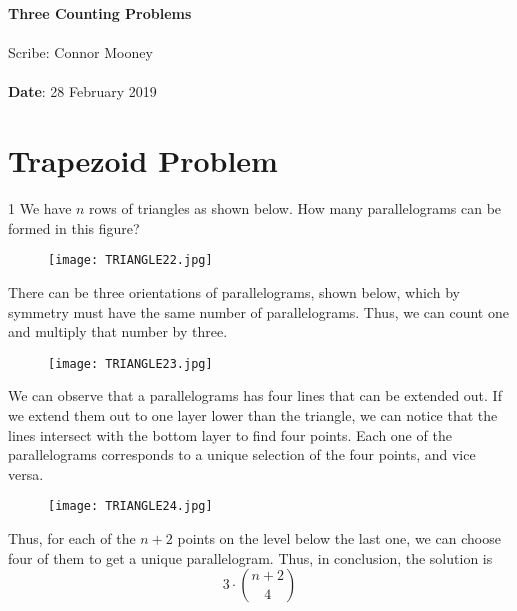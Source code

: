 \documentclass[11pt,twosided]{article}
\def\titlestring{Three Counting Problems}
\def\scribestring{Connor Mooney}
\def\datestring{28 February 2019}
\begin{document}
\thispagestyle{plain}  %

\noindent
{\LARGE \textbf{\titlestring}}\\\\
%
{\Large Scribe: \scribestring}\\ \\
{\textbf{Date}: \datestring}


\noindent

\section{Trapezoid Problem}
\begin{problem}
	1 We have $n$ rows of triangles as shown below. How many parallelograms can be formed in this figure?
\end{problem}
\begin{figure}[h]
\texttt{[image: TRIANGLE22.jpg]}
\centering
\end{figure}
\begin{solution}
There can be three orientations of parallelograms, shown below, which by symmetry must have the same number of parallelograms. Thus, we can count one and multiply that number by three.
\begin{figure}[H]
\texttt{[image: TRIANGLE23.jpg]}
\centering
\end{figure}
We can observe that a parallelograms has four lines that can be extended out. If we extend them out to one layer lower than the triangle, we can notice that the lines intersect with the bottom layer to find four points. Each one of the parallelograms corresponds to a unique selection of the four points, and vice versa.
\begin{figure}[H]
\texttt{[image: TRIANGLE24.jpg]}
\centering
\end{figure}
Thus, for each of the $n+2$ points on the level below the last one, we can choose four of them to get a unique parallelogram. Thus, in conclusion, the solution is \[3\cdot{n+2 \choose 4}\]
\end{solution}
\end{document}
